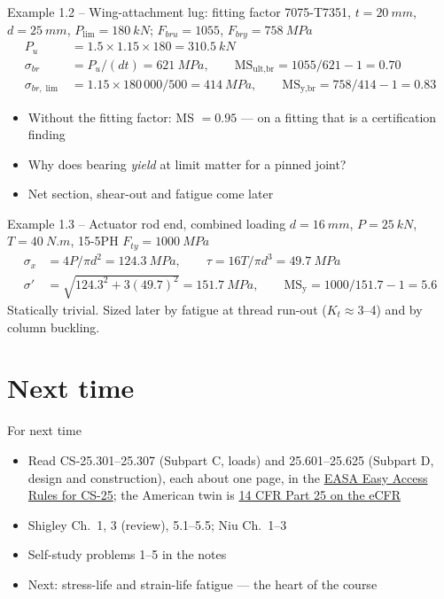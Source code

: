 \documentclass[aspectratio=169,10pt]{beamer}
\begin{document}
\begin{frame}{Example 1.2 -- Wing-attachment lug: fitting factor}
7075-T7351, $t=\SI{20}{mm}$, $d=\SI{25}{mm}$, $P_{\lim}=\SI{180}{kN}$; $F_{bru}=1055$, $F_{bry}=\SI{758}{MPa}$
\begin{align*}
P_u &= 1.5\times1.15\times180=\SI{310.5}{kN}\\
\sigma_{br} &= P_u/(dt)=\SI{621}{MPa},\qquad \mathrm{MS}_{\text{ult,br}}=1055/621-1=\mathbf{0.70}\\
\sigma_{br,\lim} &= 1.15\times180\,000/500=\SI{414}{MPa},\qquad \mathrm{MS}_{\text{y,br}}=758/414-1=\mathbf{0.83}
\end{align*}
\begin{itemize}
  \item Without the fitting factor: MS $=0.95$ --- on a fitting that is a certification finding
  \item Why does bearing \emph{yield} at limit matter for a pinned joint?
  \item Net section, shear-out and fatigue come later
\end{itemize}
\end{frame}

\begin{frame}{Example 1.3 -- Actuator rod end, combined loading}
$d=\SI{16}{mm}$, $P=\SI{25}{kN}$, $T=\SI{40}{N.m}$, 15-5PH $F_{ty}=\SI{1000}{MPa}$
\begin{align*}
\sigma_x &= 4P/\pi d^2=\SI{124.3}{MPa},\qquad \tau=16T/\pi d^3=\SI{49.7}{MPa}\\
\sigma' &= \sqrt{124.3^2+3(49.7)^2}=\SI{151.7}{MPa},\qquad \mathrm{MS}_{\text{y}}=1000/151.7-1=5.6
\end{align*}
Statically trivial. Sized later by fatigue at thread run-out ($K_t\approx3$--4) and by column buckling.
\end{frame}

\section{Next time}





\begin{frame}{For next time}
\begin{itemize}
  \item Read CS-25.301--25.307 (Subpart C, loads) and 25.601--25.625 (Subpart D, design and construction), each about one page, in the \href{https://www.easa.europa.eu/en/document-library/easy-access-rules/online-publications/easy-access-rules-large-aeroplanes-cs-25}{EASA Easy Access Rules for CS-25}; the American twin is \href{https://www.ecfr.gov/current/title-14/chapter-I/subchapter-C/part-25}{14 CFR Part 25 on the eCFR}
  \item Shigley Ch.\ 1, 3 (review), 5.1--5.5; Niu Ch.\ 1--3
  \item Self-study problems 1--5 in the notes
  \item Next: stress-life and strain-life fatigue --- the heart of the course
\end{itemize}
\end{frame}
\end{document}
